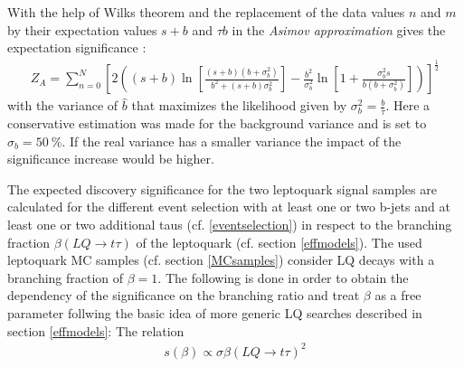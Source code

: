 %
With the help of Wilks theorem \cite{Wilks} and the replacement of the data values $n$ and $m$ by their expectation values $s+b$ and $\tau b$ in the \textit{Asimov approximation} gives the expectation significance \cite{AsimovSignificance}:
\begin{align}
           Z_A=\sum_{n=0}^{N}\left[2\left((s+b)\ln\left[\frac{(s+b)(b+\sigma_b^2)}{b^2+(s+b)\sigma_b^2}\right]-\frac{b^2}{\sigma_b^2}\ln\left[1+\frac{\sigma_b^2s}{b(b+\sigma_b^2)}\right]\right)\right]^\frac{1}{2}
\label{ZA}
\end{align}
with the variance of $\hat{b}$ that maximizes the likelihood given by $\sigma_b^2=\frac{b}{\tau}$. Here a conservative estimation was made for the background variance and is set to $\sigma_b=\SI{50}{\percent}$. If the real variance has a smaller variance the impact of the significance increase would be higher.\par
The expected discovery significance for the two leptoquark signal samples are calculated for the different event selection with at least one or two b-jets and at least one or two additional taus (cf. \ref{eventselection}) in respect to the branching fraction $\beta(LQ\rightarrow t\tau)$ of the leptoquark (cf. section \ref{effmodels}). The used leptoquark MC samples (cf. section \ref{MCsamples}) consider LQ decays with a branching fraction of $\beta=1$. The following is done in order to obtain the dependency of the significance on the branching ratio and treat $\beta$ as a free parameter follwing the basic idea of more generic LQ searches described in section \ref{effmodels}:
The relation
\begin{align}
                s(\beta)\propto\sigma\beta(LQ\rightarrow t\tau)^2
\label{sbeta}
\end{align}
%
